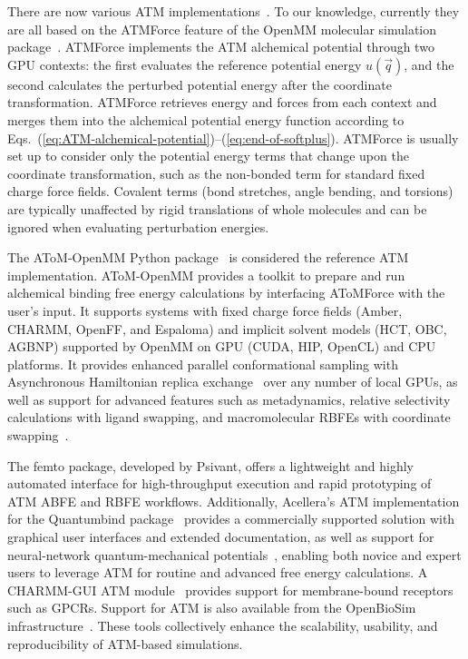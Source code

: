 \documentclass[9pt,bestpractices]{livecoms}
\begin{document}
There are now various ATM implementations~\cite{atom-openmm-github2025,femto-github2025,atm-acellera-github2025}. To our knowledge, currently they are all based on the ATMForce feature of the OpenMM molecular simulation package~\cite{eastman2023openmm}. ATMForce implements the ATM alchemical potential through two GPU contexts: the first evaluates the reference potential energy $u(\vec{q})$, and the second calculates the perturbed potential energy after the coordinate transformation. ATMForce retrieves energy and forces from each context and merges them into the alchemical potential energy function according to Eqs.~(\ref{eq:ATM-alchemical-potential})--(\ref{eq:end-of-softplus}). ATMForce is usually set up to consider only the potential energy terms that change upon the coordinate transformation, such as the non-bonded term for standard fixed charge force fields. Covalent terms (bond stretches, angle bending, and torsions) are typically unaffected by rigid translations of whole molecules and can be ignored when evaluating perturbation energies.

The AToM-OpenMM Python package~\cite{atom-openmm-github2025,atom-openmm-documentation2025} is considered the reference ATM implementation. AToM-OpenMM provides a toolkit to prepare and run alchemical binding free energy calculations by interfacing AToMForce with the user's input. It supports systems with fixed charge force fields (Amber, CHARMM, OpenFF, and Espaloma) and implicit solvent models (HCT, OBC, AGBNP) supported by OpenMM on GPU (CUDA, HIP, OpenCL) and CPU platforms. It provides enhanced parallel conformational sampling with Asynchronous Hamiltonian replica exchange~\cite{Gallicchio2008,gallicchio2015asynchronous} over any number of local GPUs, as well as support for advanced features such as metadynamics, relative selectivity calculations with ligand swapping, and macromolecular RBFEs with coordinate swapping~\cite{gallicchio2025mutants}.

The femto package\cite{femto-github2025}, developed by Psivant, offers a lightweight and highly automated interface for high-throughput execution and rapid prototyping of ATM ABFE and RBFE workflows. Additionally, Acellera's ATM implementation for the Quantumbind package~\cite{quantumbind-acellera-github2025} provides a commercially supported solution with graphical user interfaces and extended documentation, as well as support for neural-network quantum-mechanical potentials~\cite{sabanes2024enhancing}, enabling both novice and expert users to leverage ATM for routine and advanced free energy calculations. A CHARMM-GUI ATM module~\cite{zhang2024ligand} provides support for membrane-bound receptors such as GPCRs. Support for ATM is also available from the OpenBioSim infrastructure~\cite{openbiosim-diary-ATM2025}. These tools collectively enhance the scalability, usability, and reproducibility of ATM-based simulations.
\end{document}
